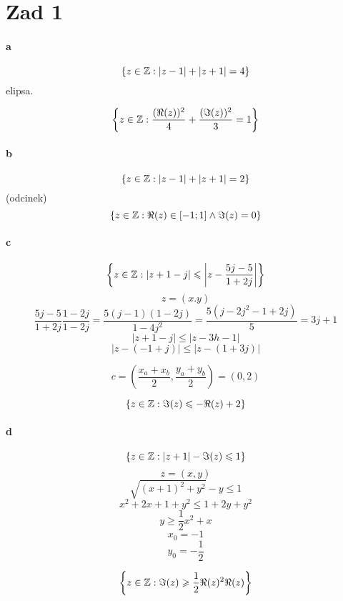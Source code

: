 \documentclass[a4paper]{article}
\title{}
\author{Paweł Stiasny}
\date{\today}
\begin{document}
	\section*{Zad 1}
	\paragraph{a}
	\[ \{ z \in \mathbb{Z} : |z-1| + |z+1| = 4 \} \]
	elipsa.
	\[ \left\{ z \in \mathbb{Z} : \frac{ (\Re(z))^2 }{ 4 } + \frac{ (\Im(z))^2 }{ 3 }
		= 1\right\} \]

	\paragraph{b}
	\[ \{ z \in \mathbb{Z} : | z - 1 | + | z + 1 | = 2 \} \]
	(odcinek)
	\[ \{ z \in \mathbb{Z} : \Re(z) \in [ -1; 1 ] \land \Im(z) = 0 \} \]

	\paragraph{c}
	\[ \left\{ z \in \mathbb{Z} : | z + 1 - j | \leqslant
		\left| z - \frac{ 5j - 5 }{ 1 + 2j } \right| \right\} \]
	\[ z = (x.y) \]
	\[ \frac{ 5j-5 }{ 1+2j } \frac{ 1-2j }{ 1-2j } =
		\frac{ 5(j-1)(1-2j) }{ 1-4j^2 }
		= \frac{ 5(j-2j^2-1+2j) }{ 5 } = 3j + 1 \]
	\[ |z+1-j| \leq |z-3h-1| \]
	\[ |z-(-1+j)| \leq |z-(1+3j)| \]

	\[ c = \left( \frac{ x_a+x_b }{ 2 }, \frac{y_a+y_b}{2} \right) = (0,2) \]

	\[ \{ z \in \mathbb{Z} : \Im(z) \leqslant - \Re(z) + 2 \} \]

	\paragraph{d}
	\[ \{ z \in \mathbb{Z} : | z + 1 | - \Im(z) \leqslant 1 \} \]
	\[ z = (x,y) \]
	\[ \sqrt{ (x+1)^2 + y^2 } - y \leq 1 \]
	\[ x^2 + 2x + 1 + y^2 \leq 1 + 2y + y^2 \]
	\[ y \geq \frac 1 2 x^2 + x \]
	\[ x_0 = -1 \]
	\[ y_0 = -\frac 1 2 \]

	\[ \left\{ z \in \mathbb{Z} : \Im(z) \geqslant \frac 1 2 \Re(z)^2 \Re(z) \right\} \]
\end{document}

